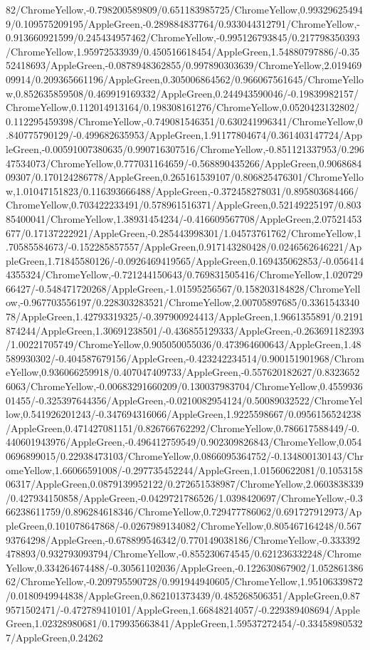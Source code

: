 {\begin{tikzternal}
82/ChromeYellow,-0.798200589809/0.651183985725/ChromeYellow,0.993296254949/0.109575209195/AppleGreen,-0.289884837764/0.933044312791/ChromeYellow,-0.913660921599/0.245434957462/ChromeYellow,-0.995126793845/0.217798350393/ChromeYellow,1.95972533939/0.450516618454/AppleGreen,1.54880797886/-0.3552418693/AppleGreen,-0.0878948362855/0.997890303639/ChromeYellow,2.01946909914/0.209365661196/AppleGreen,0.305006864562/0.966067561645/ChromeYellow,0.852635859508/0.469919169332/AppleGreen,0.244943590046/-0.19839982157/ChromeYellow,0.112014913164/0.198308161276/ChromeYellow,0.0520423132802/0.112295459398/ChromeYellow,-0.749081546351/0.630241996341/ChromeYellow,0.840775790129/-0.499682635953/AppleGreen,1.91177804674/0.361403147724/AppleGreen,-0.00591007380635/0.990716307516/ChromeYellow,-0.851121337953/0.29647534073/ChromeYellow,0.777031164659/-0.568890435266/AppleGreen,0.906868409307/0.170124286778/AppleGreen,0.265161539107/0.806825476301/ChromeYellow,1.01047151823/0.116393666488/AppleGreen,-0.372458278031/0.895803684466/ChromeYellow,0.703422233491/0.578961516371/AppleGreen,0.52149225197/0.80385400041/ChromeYellow,1.38931454234/-0.416609567708/AppleGreen,2.07521453677/0.17137222921/AppleGreen,-0.285443998301/1.04573761762/ChromeYellow,1.70585584673/-0.152285857557/AppleGreen,0.917143280428/0.0246562646221/AppleGreen,1.71845580126/-0.0926469419565/AppleGreen,0.169435062853/-0.0564144355324/ChromeYellow,-0.721244150643/0.769831505416/ChromeYellow,1.02072966427/-0.548471720268/AppleGreen,-1.01595256567/0.158203184828/ChromeYellow,-0.967703556197/0.228303283521/ChromeYellow,2.00705897685/0.336154334078/AppleGreen,1.42793319325/-0.397900924413/AppleGreen,1.9661355891/0.2191874244/AppleGreen,1.30691238501/-0.436855129333/AppleGreen,-0.263691182393/1.00221705749/ChromeYellow,0.905050055036/0.473964600643/AppleGreen,1.48589930302/-0.404587679156/AppleGreen,-0.423242234514/0.900151901968/ChromeYellow,0.936066259918/0.407047409733/AppleGreen,-0.557620182627/0.83236526063/ChromeYellow,-0.00683291660209/0.130037983704/ChromeYellow,0.455993601455/-0.325397644356/AppleGreen,-0.0210082954124/0.50089032522/ChromeYellow,0.541926201243/-0.347694316066/AppleGreen,1.9225598667/0.0956156524238/AppleGreen,0.471427081151/0.826766762292/ChromeYellow,0.786617588449/-0.440601943976/AppleGreen,-0.496412759549/0.902309826843/ChromeYellow,0.0540696899015/0.22938473103/ChromeYellow,0.0866095364752/-0.134800130143/ChromeYellow,1.66066591008/-0.297735452244/AppleGreen,1.01560622081/0.105315806317/AppleGreen,0.0879139952122/0.272651538987/ChromeYellow,2.0603838339/0.427934150858/AppleGreen,-0.0429721786526/1.0398420697/ChromeYellow,-0.366238611759/0.896284618346/ChromeYellow,0.729477786062/0.691727912973/AppleGreen,0.101078647868/-0.0267989134082/ChromeYellow,0.805467164248/0.56793764298/AppleGreen,-0.678899546342/0.770149038186/ChromeYellow,-0.333392478893/0.932793093794/ChromeYellow,-0.855230674545/0.621236332248/ChromeYellow,0.334264674488/-0.30561102036/AppleGreen,-0.122630867902/1.05286138662/ChromeYellow,-0.209795590728/0.991944940605/ChromeYellow,1.95106339872/0.0180949944838/AppleGreen,0.862101373439/0.485268506351/AppleGreen,0.879571502471/-0.472789410101/AppleGreen,1.66848214057/-0.229389408694/AppleGreen,1.02328980681/0.179935663841/AppleGreen,1.59537272454/-0.334589805327/AppleGreen,0.24262
\end{tikzternal}}
